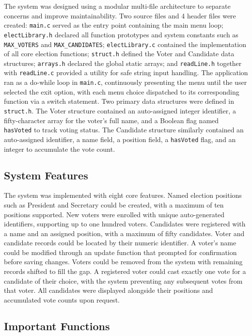 \documentclass[12pt,a4paper]{article}
\begin{document}
The system was designed using a modular multi-file architecture to separate concerns
and improve maintainability. Two source files and 4 header files were created: \texttt{main.c} served as the
entry point containing the main menu loop; \texttt{electLibrary.h} declared all function
prototypes and system constants such as \texttt{MAX\_VOTERS} and \texttt{MAX\_CANDIDATES};
\texttt{electLibrary.c} contained the implementation of all core election functions;
\texttt{struct.h} defined the Voter and Candidate data structures; \texttt{arrays.h} declared
the global static arrays; and \texttt{readLine.h} together with \texttt{readLine.c} provided a
utility for safe string input handling. The application ran as a do-while loop in
\texttt{main.c}, continuously presenting the menu until the user selected the exit option,
with each menu choice dispatched to its corresponding function via a switch statement.
Two primary data structures were defined in \texttt{struct.h}. The Voter structure contained
an auto-assigned integer identifier, a fifty-character array for the voter's full name,
and a Boolean flag named \texttt{hasVoted} to track voting status. The Candidate structure
similarly contained an auto-assigned identifier, a name field, a position field, a
\texttt{hasVoted} flag, and an integer to accumulate the vote count.

\subsection{System Features}

The system was implemented with eight core features. Named election positions such as
President and Secretary could be created, with a maximum of ten positions supported.
New voters were enrolled with unique auto-generated identifiers, supporting up to one
hundred voters. Candidates were registered with a name and an assigned position, with
a maximum of fifty candidates. Voter and candidate records could be located by their
numeric identifier. A voter's name could be modified through an update function that
prompted for confirmation before saving changes. Voters could be removed from the
system with remaining records shifted to fill the gap. A registered voter could cast
exactly one vote for a candidate of their choice, with the system preventing any
subsequent votes from that voter. All candidates were displayed alongside their
positions and accumulated vote counts upon request.

\subsection{Important Functions}
\end{document}
